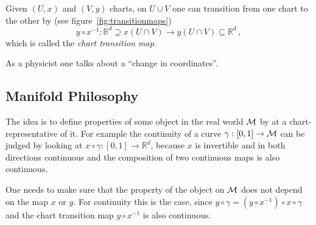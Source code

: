\begin{figure*}[tbh]

    \caption{Visualization of chart transition maps. ``How to glue together the charts of an atlas.'' Plot modified from~\citep{texstackexchange:manifolds}}
    \label{fig:transitionmaps}
\end{figure*}
Given $(U, x)$ and $(V, y)$ charts, on $U\cup V$ one can transition from
one chart to the other by (see figure~\ref{fig:transitionmaps})
\begin{equation}
    y\circ x^{-1}: \mathbb{R}^{d} \supseteq x(U\cap V) \to y(U\cap V) \subseteq \mathbb{R}^{d}\,,
\end{equation}
which is called the \textit{chart transition map}.
\begin{note}
    As a physicist one talks about a ``change in coordinates''.
\end{note}

\subsection{Manifold Philosophy}

The idea is to define properties of some object in the real world $\mathcal{M}$ by at a chart-representative
of it. For example the continuity of a curve $\gamma: [0,1]\to\mathcal{M}$ can be judged by looking at
$x\circ\gamma: [0,1]\to\mathbb{R}^{d}$, because $x$ is invertible and in both directions continuous
and the composition of two continuous maps is also continuous.
\begin{note}
    One needs to make sure that the property of the object on $\mathcal{M}$ does not depend on the
    map $x$ or $y$. For continuity this is the case, since 
    $y\circ\gamma = (y\circ x^{-1}) \circ x\circ \gamma$ and the chart transition map
    $y\circ x^{-1}$ is also continuous.
\end{note}

